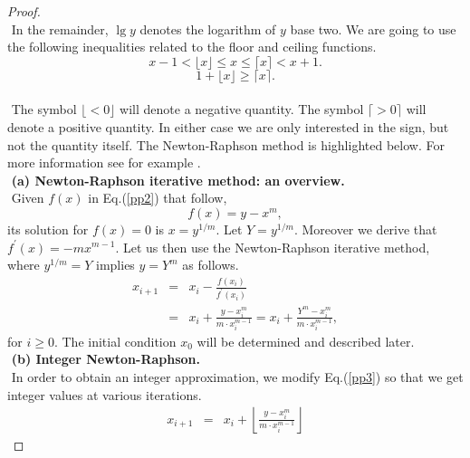 \documentclass[11pt]{article}
\newcommand{\ceil}[1]{\lceil #1 \rceil}
\newcommand{\floor}[1]{\lfloor #1 \rfloor}
\begin{document}
\begin{proof}
%
$ $ \\ $ $
In the remainder, $\lg{y}$ denotes the logarithm of $y$ base two.
We are going to use the following inequalities related to
the floor and ceiling functions.
\begin{equation}
\label{pp1a}
x-1  <  \floor{x} \leq x \leq \ceil{x} < x+1 .
\end{equation}
\begin{equation}
\label{pp1b}
1+ \floor{x} \geq \ceil{x} .
\end{equation}
$ $ \\ $ $
The symbol $\floor{< 0}$ will denote a negative quantity. The symbol
$\ceil{>0}$ will denote a positive quantity.
In either case we are only interested in the sign, but not the
quantity itself.
The Newton-Raphson method is highlighted below. For more information
see for example \cite{Rudin}.
$ $ \\ $ $
{\bf (a) Newton-Raphson iterative method: an overview.}
$ $ \\ $ $
Given $f(x)$ in Eq.(\ref{pp2}) that follow,
\begin{equation}
\label{pp2}
  f(x) = y - x^m ,
\end{equation}
its solution for $f(x)=0$ is $x = y^{1/m}$. Let $Y= y^{1/m}$.
Moreover we derive that
$f^\prime (x) = - m x^{m-1}$.
Let us then use the Newton-Raphson iterative method, where
$y^{1/m} = Y$ implies $y = Y^m$ as follows.
\begin{eqnarray}
\label{pp3}
x_{i+1} &=& x_{i} - \frac{f(x_i ) }{ f^\prime (x_i )} \nonumber \\
        &=& x_i + \frac{y-x_i^m}{m \cdot x_i^{m-1}}
        = x_i + \frac{Y^m -x_i^m}{m \cdot x_i^{m-1}},
\end{eqnarray}
for $i \geq 0$. The initial condition
$x_0$ will be determined and described later.
%
%
%
$ $ \\ $ $
{\bf (b) Integer Newton-Raphson.}
$ $ \\ $ $
In order to obtain an integer approximation, we
modify Eq.(\ref{pp3}) so that we get integer values at various
iterations.
\begin{eqnarray}
x_{i+1}
&=&
\label{pp4}
    x_i + \left\lfloor \frac{y-x_i^m}{m \cdot x_i^{m-1}} \right\rfloor

\end{eqnarray}
\end{proof}
\end{document}
